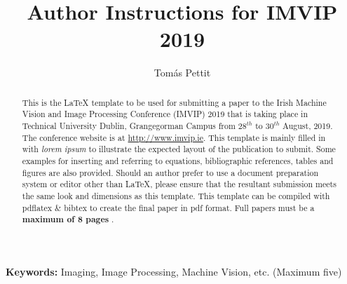\documentclass[a4paper,11pt]{article}
\begin{document}
\title{Author Instructions for IMVIP 2019}

\author{Tomás Pettit}
\date{}
\maketitle
\thispagestyle{empty}



\begin{abstract}
This is the \LaTeX\xspace template to be used for submitting a paper
to the Irish Machine Vision and Image Processing Conference (IMVIP)
2019 that is taking place in Technical University Dublin, Grangegorman Campus from $28^{th}$ 
to $30^{th}$ August, 2019. The conference website is at
\url{http://www.imvip.ie}. This template is mainly filled in
with \textit{lorem ipsum} to illustrate the expected layout of the
publication to submit.  Some examples for inserting and referring to
equations, bibliographic references, tables and figures are also
provided. Should an author prefer to use a document preparation system
or editor other than \LaTeX\xspace, please ensure that the resultant
submission meets the same look and dimensions as this template.  This
template can be compiled with pdflatex \& bibtex to create the final
paper in pdf format. Full papers must be a \textbf{maximum of 8 pages
}.
\end{abstract}
\textbf{Keywords:} Imaging, Image Processing, Machine Vision, etc. (Maximum five)



\end{document}

